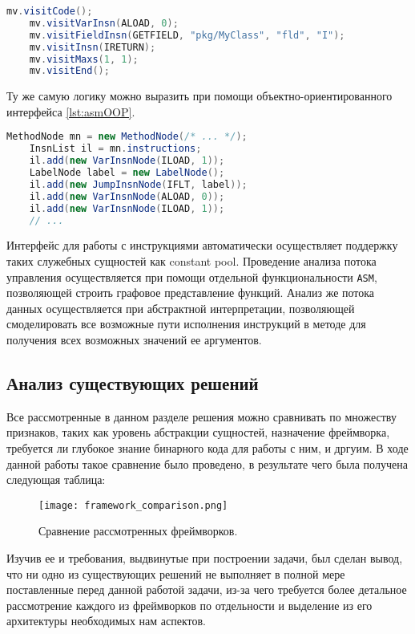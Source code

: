 \begin{lstlisting}[language=Java, caption=Пример использования событийного интерфейса., label=lst:asmVisitor]
    mv.visitCode();
    mv.visitVarInsn(ALOAD, 0);
    mv.visitFieldInsn(GETFIELD, "pkg/MyClass", "fld", "I");
    mv.visitInsn(IRETURN);
    mv.visitMaxs(1, 1);
    mv.visitEnd();
\end{lstlisting}

Ту же самую логику можно выразить при помощи объектно-ориентированного интерфейса \autoref{lst:asmOOP}.

\begin{lstlisting}[language=Java, caption=Пример использования объектно-ориентированного интерфейса., label=lst:asmOOP]
    MethodNode mn = new MethodNode(/* ... */);
    InsnList il = mn.instructions;
    il.add(new VarInsnNode(ILOAD, 1));
    LabelNode label = new LabelNode();
    il.add(new JumpInsnNode(IFLT, label));
    il.add(new VarInsnNode(ALOAD, 0));
    il.add(new VarInsnNode(ILOAD, 1));
    // ...
\end{lstlisting}

Интерфейс для работы с инструкциями автоматически осуществляет поддержку таких служебных сущностей как constant pool. Проведение анализа потока управления осуществляется при помощи отдельной функциональности \texttt{ASM}, позволяющей строить графовое представление функций. Анализ же потока данных осуществляется при абстрактной интерпретации, позволяющей смоделировать все возможные пути исполнения инструкций в методе для получения всех возможных значений ее аргументов.

\subsection{Анализ существующих решений}

Все рассмотренные в данном разделе решения можно сравнивать по множеству признаков, таких как уровень абстракции сущностей, назначение фреймворка, требуется ли глубокое знание бинарного кода для работы с ним, и дргуим. В ходе данной работы такое сравнение было проведено, в результате чего была получена следующая таблица:

\begin{figure}[h]
\centering
\texttt{[image: framework\_comparison.png]}
\caption{Сравнение рассмотренных фреймворков.}
\label{fig:kavaArch}
\end{figure}

Изучив ее и требования, выдвинутые при построении задачи, был сделан вывод, что ни одно из существующих решений не выполняет в полной мере поставленные перед данной работой задачи, из-за чего требуется более детальное рассмотрение каждого из фреймворков по отдельности и выделение из его архитектуры необходимых нам аспектов.

\newpage
